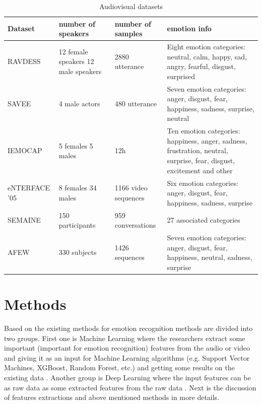 \documentclass[oneside]{report}
\begin{document}
    \begin{table}[ht!]
    \centering
    \begin{tabular}{ | m{2.3cm} |  m{3cm} | m{2.1cm} | m{6cm} |} 
    \hline
    Dataset & number of speakers & number of samples & emotion info \\ 
    \hline
    RAVDESS \cite{RAVDESS} & 12 female speakers 12 male speakers & 2880 utterance & Eight emotion categories: neutral, calm, happy, sad, angry, fearful, disgust, surprised  \\ 
    \hline
    SAVEE \cite{savee} & 4 male actors & 480 utterance & Seven emotion categories: anger, disgust, fear, happiness, sadness, surprise, neutral \\ 
    \hline
    IEMOCAP \cite{iemocap} & 5 females 5 males & 12h & Ten emotion categories: happiness, anger, sadness, frustration, neutral, surprise, fear, disgust, excitement and other \\
    \hline 
    eNTERFACE ’05 \cite{enterface}  & 8 females 34 males & 1166 video sequences & Six emotion categories: anger, disgust, fear, happiness, sadness, surprise \\
    \hline
    SEMAINE \cite{semanie} & 150 participants & 959 conversations & 27 associated categories \\
    \hline
    AFEW \cite{afew} & 330 subjects & 1426 sequences & Seven emotion categories: anger, disgust, fear, happiness, neutral, sadness, surprise \\
    \hline
    \end{tabular}
    \label{table:datasets}
    \caption{Audiovisual datasets}
    \end{table}


\section{Methods}

    Based on the existing methods for emotion recognition methods are divided into two groups. First one is Machine Learning where the researchers extract some important (important for emotion recognition) features from the audio or video and giving it as an input for Machine Learning algorithms (e.g. Support Vector Machines, XGBoost, Random Forest, etc.) and getting some results on the existing data \cite{india_2020, slovenia_2014, waterloo_2019}. Another group is Deep Learning where the input features can be as raw data as some extracted features from the raw data \cite{muse_2019, stanford_2020, china_2020, estonia_2018, india_2014}. Next is the discussion of features extractions and above mentioned methods in more details. 
    
\end{document}
